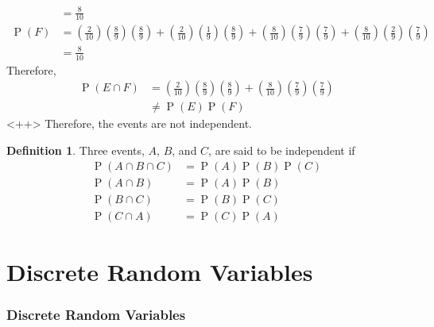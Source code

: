 \documentclass[titlepage, fleqn, a4paper, 12pt, twoside]{article}
\theoremstyle{definition}
\newtheorem{definition}{Definition}
\theoremstyle{theorem}
\DeclareMathOperator{\prob}{\mathrm{P}}
\begin{document}
\begin{solution}
\begin{align*}
                         & = \frac{8}{10}                                                                                                                                                                                                                                                                                                                                  \\
		\prob(F) & = \left( \frac{2}{10} \right) \left( \frac{8}{9} \right) \left( \frac{8}{9} \right) + \left( \frac{2}{10} \right) \left( \frac{1}{9} \right) \left( \frac{8}{9} \right) + \left( \frac{8}{10} \right) \left( \frac{7}{9} \right) \left( \frac{7}{9} \right) + \left( \frac{8}{10} \right) \left( \frac{2}{9} \right) \left( \frac{7}{9} \right) \\
                         & = \frac{8}{10}
	\end{align*}
	Therefore,
	\begin{align*}
		\prob(E \cap F) & = \left( \frac{2}{10} \right) \left( \frac{8}{9} \right) \left( \frac{8}{9} \right) + \left( \frac{8}{10} \right) \left( \frac{7}{9} \right) \left( \frac{7}{9} \right) \\
                                & \neq \prob(E) \prob(F)
	\end{align*}<++>
	Therefore, the events are not independent.
\end{solution}

\begin{definition}
	Three events, $A$, $B$, and $C$, are said to be independent if
	\begin{align*}
		\prob(A \cap B \cap C) & = \prob(A) \prob(B) \prob(C) \\
		\prob(A \cap B)        & = \prob(A) \prob(B)          \\
		\prob(B \cap C)        & = \prob(B) \prob(C)          \\
		\prob(C \cap A)        & = \prob(C) \prob(A)
	\end{align*}
\end{definition}

\clearpage
\part{Discrete Random Variables}

\section{Discrete Random Variables}
\end{document}
